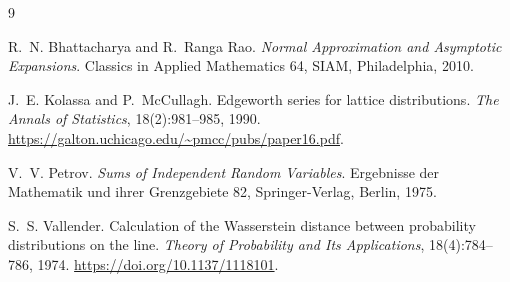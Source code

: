 \documentclass[11pt]{article}
\theoremstyle{remark}
\begin{document}
\begin{thebibliography}{9}

R.~N. Bhattacharya and R.~Ranga Rao.
\newblock \emph{Normal Approximation and Asymptotic Expansions}.
\newblock Classics in Applied Mathematics 64, SIAM, Philadelphia, 2010.

J.~E. Kolassa and P.~McCullagh.
\newblock Edgeworth series for lattice distributions.
\newblock \emph{The Annals of Statistics}, 18(2):981--985, 1990.
\newblock \url{https://galton.uchicago.edu/~pmcc/pubs/paper16.pdf}.

V.~V. Petrov.
\newblock \emph{Sums of Independent Random Variables}.
\newblock Ergebnisse der Mathematik und ihrer Grenzgebiete 82,
Springer-Verlag, Berlin, 1975.

S.~S. Vallender.
\newblock Calculation of the Wasserstein distance between probability
distributions on the line.
\newblock \emph{Theory of Probability and Its Applications}, 18(4):784--786,
1974.
\newblock \url{https://doi.org/10.1137/1118101}.

\end{thebibliography}
\end{document}

